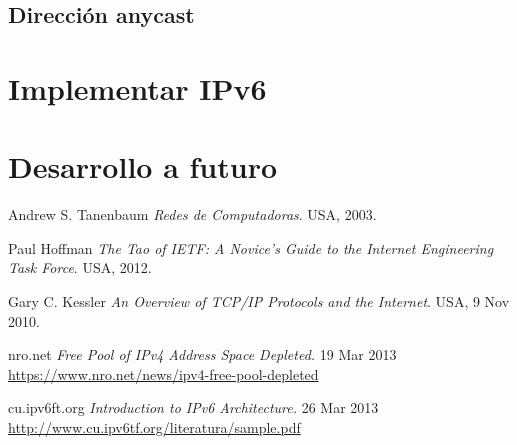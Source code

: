 \documentclass[11pt,a4paper]{article}
\begin{document}
\subsection{Dirección anycast}


\section{Implementar IPv6}
\section{Desarrollo a futuro}

\newpage
\begin{thebibliography}{9}

  Andrew S. Tanenbaum
  \emph{Redes de Computadoras}.
  USA,
  2003.

  Paul Hoffman
  \emph{The Tao of IETF: A Novice's Guide to the Internet Engineering Task Force}.
  USA,
  2012.
		
  Gary C. Kessler
  \emph{An Overview of TCP/IP Protocols and the Internet}.
  USA,
  9 Nov 2010.
		
 nro.net
 \emph{Free Pool of IPv4 Address Space Depleted.} 
 19 Mar 2013\\
	\url{https://www.nro.net/news/ipv4-free-pool-depleted}	

 cu.ipv6ft.org 
 \emph{Introduction to IPv6 Architecture.} 
 26 Mar 2013\\
	\url{http://www.cu.ipv6tf.org/literatura/sample.pdf}
					
\end{thebibliography}
\end{document}
